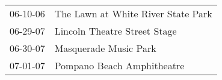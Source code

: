 \begin{supertabular}{p{0.25\columnwidth}p{0.75\columnwidth}}
 06-10-06 &  The Lawn at White River State Park \\
 06-29-07 &        Lincoln Theatre Street Stage \\
 06-30-07 &               Masquerade Music Park \\
 07-01-07 &          Pompano Beach Amphitheatre \\
\end{supertabular}
